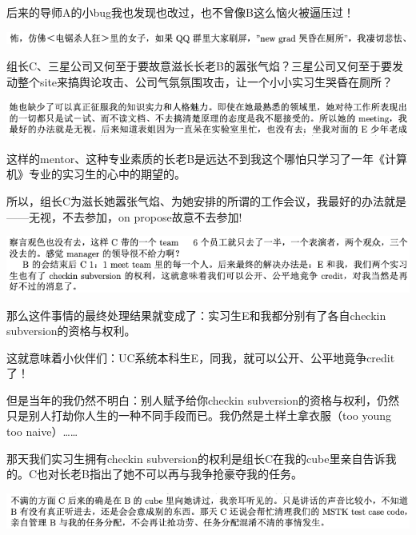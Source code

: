 \documentclass[9pt, b5paper]{article}
\begin{document}
后来的导师A的小bug我也发现也改过，也不曾像B这么恼火被逼压过！

\begin{center}
\includegraphics[width=.9\linewidth]{./pic/backups_plans_20210505_132722.png}
\end{center}

组长C、三星公司又何至于要故意滋长长老B的嚣张气焰？三星公司又何至于要发动整个site来搞舆论攻击、公司气氛氛围攻击，让一个小小实习生哭昏在厕所？

\begin{center}
\includegraphics[width=.9\linewidth]{./pic/backups_plans_20210504_231527.png}
\end{center}

这样的mentor、这种专业素质的长老B是远达不到我这个哪怕只学习了一年《计算机》专业的实习生的心中的期望的。

所以，组长C为滋长她嚣张气焰、为她安排的所谓的工作会议，我最好的办法就是——无视，不去参加，on propose故意不去参加!

\begin{center}
\includegraphics[width=.9\linewidth]{./pic/backups_plans_20210504_231608.png}
\end{center}

那么这件事情的最终处理结果就变成了：实习生E和我都分别有了各自checkin subversion的资格与权利。

这就意味着小伙伴们：UC系统本科生E，同我，就可以公开、公平地竟争credit了！

但是当年的我仍然不明白：别人赋予给你checkin subversion的资格与权利，仍然只是别人打劫你人生的一种不同手段而已。我仍然是土样土拿衣服（too young too naive）\ldots{}\ldots{}

那天我们实习生拥有checkin subversion的权利是组长C在我的cube里亲自告诉我的。C也对长老B指出了她不可以再与我争抢豪夺我的任务。

\begin{center}
\includegraphics[width=.9\linewidth]{./pic/backups_plans_20210505_134738.png}
\end{center}
\end{document}
